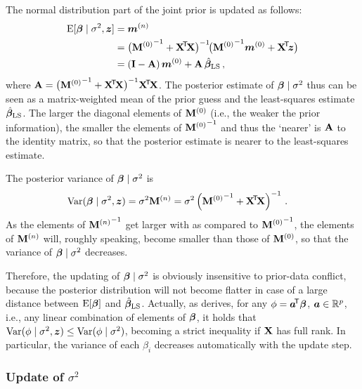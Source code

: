 The normal distribution part of the joint prior is updated as follows:%
\begin{align*}
\operatorname{E}[\boldsymbol{\beta}\mid\sigma^2, {\bm z}] &= {\bm m}^{(n)} \\
                           &= \big( {\mathbf{M}^{(0)}}^{-1} + \mathbf{X}^{{\mbox{\!\scriptsize\textsf{T}}}} \! \mathbf{X} \big)^{-1} \!\big( {\mathbf{M}^{(0)}}^{-1} {\bm m}^{(0)} + \mathbf{X}^{{\mbox{\!\scriptsize\textsf{T}}}} \! {\bm z} \big) \\
                           &= (\mathbf{I} - \mathbf{A})\, {\bm m}^{(0)} + \mathbf{A}\, \hat{\boldsymbol{\beta}}_\text{LS}\,,
\end{align*}
where $\mathbf{A} = \big({\mathbf{M}^{(0)}}^{-1} + \mathbf{X}^{{\mbox{\!\scriptsize\textsf{T}}}} \! \mathbf{X}\big)^{-1} \mathbf{X}^{{\mbox{\!\scriptsize\textsf{T}}}} \! \mathbf{X}$. The posterior estimate of $\boldsymbol{\beta}\mid\sigma^2$
thus can be seen as a matrix-weighted mean of the prior guess and the least-squares estimate $\hat{\boldsymbol{\beta}}_\text{LS}$.
The larger the diagonal elements of $\mathbf{M}^{(0)}$ (i.e., the weaker the prior information),
the smaller the elements of ${\mathbf{M}^{(0)}}^{-1}$ and thus the `nearer' is $\mathbf{A}$ to the identity matrix,
so that the posterior estimate is nearer to the least-squares estimate.

The posterior variance of $\boldsymbol{\beta}\mid\sigma^2$ is %
\begin{align*}
\operatorname{Var}(\boldsymbol{\beta}\mid\sigma^2, {\bm z}) &= \sigma^2 \mathbf{M}^{(n)} = \sigma^2 \left( {\mathbf{M}^{(0)}}^{-1} + \mathbf{X}^{{\mbox{\!\scriptsize\textsf{T}}}} \! \mathbf{X} \right)^{-1}\,.
\end{align*}
As the elements of ${\mathbf{M}^{(n)}}^{-1}$ get larger with as compared to ${\mathbf{M}^{(0)}}^{-1}$,
the elements of $\mathbf{M}^{(n)}$ will, roughly speaking, become smaller than those of $\mathbf{M}^{(0)}$,
so that the variance of $\boldsymbol{\beta}\mid\sigma^2$ decreases.

Therefore, the updating of $\boldsymbol{\beta}\mid\sigma^2$ is obviously insensitive to prior-data conflict,
because the posterior distribution will not become flatter in case of a large
distance between $\operatorname{E}[\boldsymbol{\beta}]$ and $\hat{\boldsymbol{\beta}}_\text{LS}$. %
Actually, as \textcite{1994:ohagan} derives,
for any $\phi = {\bm a}^{{\mbox{\!\scriptsize\textsf{T}}}} \boldsymbol{\beta}$, ${\bm a} \in \mathbb{R}^p$, i.e., any linear combination of elements of $\boldsymbol{\beta}$, it holds that
$\operatorname{Var}(\phi\mid\sigma^2,{\bm z}) \leq \operatorname{Var}(\phi\mid\sigma^2)$, becoming a strict inequality if
$\mathbf{X}$ has full rank. In particular, the variance of each $\beta_i$ decreases
automatically with the update step.


\subsubsection{Update of \texorpdfstring{$\sigma^2$}{sigma2}}
\label{sec:scp-update2}

